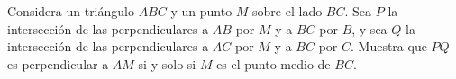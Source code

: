 Considera un triángulo $ABC$ y un punto $M$ sobre el lado $BC$. Sea $P$ la intersección de las
perpendiculares a $AB$ por $M$ y a $BC$ por $B$, y sea $Q$ la intersección de las perpendiculares
a $AC$ por $M$ y a $BC$ por $C$. Muestra que $PQ$ es perpendicular a $AM$ si y solo si $M$ es el
punto medio de $BC$.